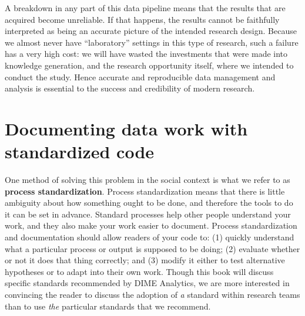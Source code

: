 A breakdown in any part of this data pipeline
means that the results that are acquired become unreliable.\cite{mccullough2008economics}
If that happens, the results cannot be faithfully interpreted
as being an accurate picture of the intended research design.
Because we almost never have ``laboratory'' settings
in this type of research,
such a failure has a very high cost:
we will have wasted the investments that were made into knowledge generation,
and the research opportunity itself,
where we intended to conduct the study.\cite{camerer2016evaluating}
Hence accurate and reproducible data management and analysis
is essential to the success and credibility of modern research.

\section{Documenting data work with standardized code}

One method of solving this problem in the social context
is what we refer to as \textbf{process standardization}.
Process standardization means that there is
little ambiguity about how something ought to be done,
and therefore the tools to do it can be set in advance.
Standard processes help other people understand your work,
and they also make your work easier to document.
Process standardization and documentation should allow readers of your code to:
(1) quickly understand what a particular process or output is supposed to be doing;
(2) evaluate whether or not it does that thing correctly; and
(3) modify it either to test alternative hypotheses or to adapt into their own work.
Though this book will discuss specific standards recommended by DIME Analytics,
we are more interested in convincing the reader
to discuss the adoption of \textit{a} standard within research teams
than to use \textit{the} particular standards that we recommend.

